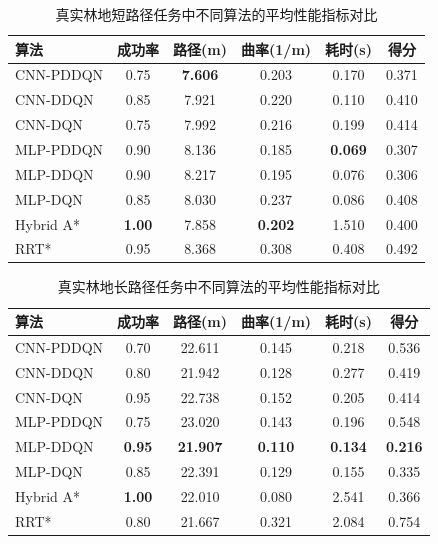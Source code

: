 \documentclass{iopjournal}
\begin{document}
\begin{table}[t]
\centering
\caption{真实林地短路径任务中不同算法的平均性能指标对比}
\label{tab:real_short}
\footnotesize
\begin{tabular}{@{}lccccc@{}}
\toprule
\textbf{算法} & \textbf{成功率} & \textbf{路径(m)} & \textbf{曲率(1/m)} & \textbf{耗时(s)} & \textbf{得分} \\
\midrule
CNN-PDDQN  & 0.75 & \textbf{7.606} & 0.203 & 0.170 & 0.371 \\
CNN-DDQN   & 0.85 & 7.921 & 0.220 & 0.110 & 0.410 \\
CNN-DQN    & 0.75 & 7.992 & 0.216 & 0.199 & 0.414 \\
MLP-PDDQN  & 0.90 & 8.136 & 0.185 & \textbf{0.069} & 0.307 \\
MLP-DDQN   & 0.90 & 8.217 & 0.195 & 0.076 & 0.306 \\
MLP-DQN    & 0.85 & 8.030 & 0.237 & 0.086 & 0.408 \\
Hybrid A*  & \textbf{1.00} & 7.858 & \textbf{0.202} & 1.510 & 0.400 \\
RRT*       & 0.95 & 8.368 & 0.308 & 0.408 & 0.492 \\
\bottomrule
\end{tabular}
\end{table}

\begin{table}[t]
\centering
\caption{真实林地长路径任务中不同算法的平均性能指标对比}
\label{tab:real_long}
\footnotesize
\begin{tabular}{@{}lccccc@{}}
\toprule
\textbf{算法} & \textbf{成功率} & \textbf{路径(m)} & \textbf{曲率(1/m)} & \textbf{耗时(s)} & \textbf{得分} \\
\midrule
CNN-PDDQN  & 0.70 & 22.611 & 0.145 & 0.218 & 0.536 \\
CNN-DDQN   & 0.80 & 21.942 & 0.128 & 0.277 & 0.419 \\
CNN-DQN    & 0.95 & 22.738 & 0.152 & 0.205 & 0.414 \\
MLP-PDDQN  & 0.75 & 23.020 & 0.143 & 0.196 & 0.548 \\
MLP-DDQN   & \textbf{0.95} & \textbf{21.907} & \textbf{0.110} & \textbf{0.134} & \textbf{0.216} \\
MLP-DQN    & 0.85 & 22.391 & 0.129 & 0.155 & 0.335 \\
Hybrid A*  & \textbf{1.00} & 22.010 & 0.080 & 2.541 & 0.366 \\
RRT*       & 0.80 & 21.667 & 0.321 & 2.084 & 0.754 \\
\bottomrule
\end{tabular}
\end{table}
\end{document}
